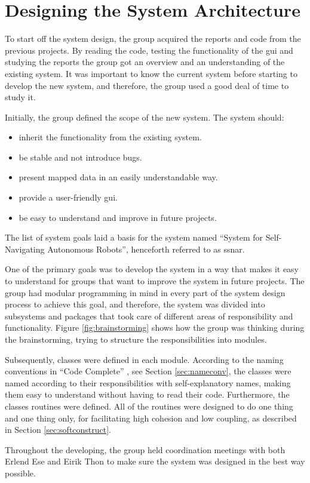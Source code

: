 \section{Designing the System Architecture}
To start off the system design, the group acquired the reports and code from the previous projects. By reading the code, testing the functionality of the \acrshort{gui} and studying the reports the group got an overview and an understanding of the existing system. It was important to know the current system before starting to develop the new system, and therefore, the group used a good deal of time to study it.

Initially, the group defined the scope of the new system. The system should:
\begin{itemize}
    \item inherit the functionality from the existing system.
    \item be stable and not introduce bugs.
    \item present mapped data in an easily understandable way.
    \item provide a user-friendly \acrshort{gui}.
    \item be easy to understand and improve in future projects.
\end{itemize}
The list of system goals laid a basis for the system named ``System for Self-Navigating Autonomous Robots'', henceforth referred to as \acrshort{ssnar}.

One of the primary goals was to develop the system in a way that makes it easy to understand for groups that want to improve the system in future projects. The group had modular programming in mind in every part of the system design process to achieve this goal, and therefore, the system was divided into subsystems and packages that took care of different areas of responsibility and functionality. Figure \ref{fig:brainstorming} shows how the group was thinking during the brainstorming, trying to structure the responsibilities into modules. 

Subsequently, classes were defined in each module. According to the naming conventions in ``Code Complete'' \cite{stevemcconnell2004}, see Section \ref{sec:nameconv}, the classes were named according to their responsibilities with self-explanatory names, making them easy to understand without having to read their code. Furthermore, the classes routines were defined. All of the routines were designed to do one thing and one thing only, for facilitating high cohesion and low coupling, as described in Section \ref{sec:softconstruct}.

Throughout the developing, the group held coordination meetings with both Erlend Ese and Eirik Thon to make sure the system was designed in the best way possible.

